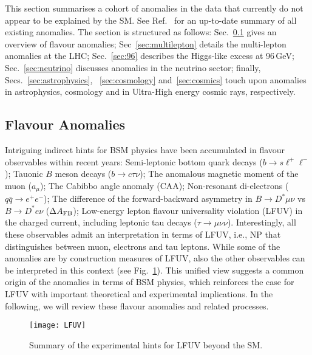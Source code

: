 \documentclass[10pt]{article}
\begin{document}
\medskip\noindent
This section summarises a cohort of anomalies in the data that currently do not appear to be explained by the SM. See Ref.~\cite{anomalies} for an up-to-date summary of all existing anomalies. The section is structured as follows: Sec.~\ref{sec:flavoranomalies} gives an overview of flavour anomalies; Sec~\ref{sec:multilepton} details the multi-lepton anomalies at the LHC; Sec.~\ref{sec:96} describes the Higgs-like excess at 96\,GeV; Sec.~\ref{sec:neutrino} discusses anomalies in the neutrino sector; finally, Secs.~\ref{sec:astrophysics}, ~\ref{sec:cosmology} and~\ref{sec:cosmics} touch upon anomalies in astrophysics, cosmology and in Ultra-High energy cosmic rays, respectively. 


\subsection{Flavour Anomalies} 
\label{sec:flavoranomalies}
%
Intriguing indirect hints for BSM physics have been accumulated in flavour observables within recent years:
Semi-leptonic bottom quark decays ($b\to s\ell^+\ell^-$);
Tauonic $B$ meson decays ($b\to c\tau\nu$);
The anomalous magnetic moment of the muon ($a_\mu$);
The Cabibbo angle anomaly (CAA);
Non-resonant di-electrons ($q\bar q \to e^+e^-$);
The difference of the forward-backward asymmetry in $B\to D^*\mu\nu$ vs $B\to D^*e\nu$ ($\Delta A_{\rm FB}$);
Low-energy lepton flavour universality violation (LFUV) in the charged current, including leptonic tau decays ($\tau\to\mu\nu\nu$).
%
Interestingly, all these observables admit an interpretation in terms of LFUV, i.e., NP that distinguishes between muon, electrons and tau leptons. While some of the anomalies are by construction measures of LFUV, also the other observables can be interpreted in this context (see Fig.~\ref{fig:LFUV}). This unified view suggests a common origin of the anomalies in terms of BSM physics, which reinforces the case for LFUV with important theoretical and experimental implications. In the following, we will review these flavour anomalies and related processes.

\begin{figure}
\centering
\texttt{[image: LFUV]}
  \caption{Summary of the experimental hints for LFUV beyond the SM.}
  \label{fig:LFUV}
\end{figure}
\end{document}
